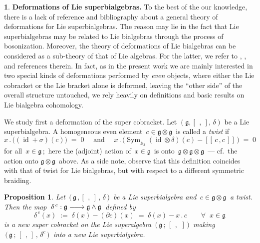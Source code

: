 \documentclass[12pt,reqno,twoside,a4paper]{amsart}
\numberwithin{equation}{section}
\newtheorem{prop}[lema]{Proposition}
\theoremstyle{definition}
\newtheorem{free text}[lema]{}
\theoremstyle{remark}
\newcommand \id{\operatorname{id}}
\newcommand \Sym{\operatorname{Sym}}
\def \lieg{\mathfrak{g}}
\theoremstyle{plain}
\begin{document}
\vskip9pt

\begin{free text}  \label{deformations of LSbA's}
%
{\bf Deformations of Lie superbialgebras.}
 To the best of the our knowledge, there is a lack of reference and bibliography about
 a general theory of  deformations  for Lie superbialgebras. The reason may lie in the fact that
 Lie superbialgebras may be related to Lie bialgebras through the process of bosonization. Moreover,
 the theory of deformations of Lie bialgebras can be considered as a sub-theory of that of Lie algebras. For
 the latter, we refer to
 \cite{CG},  \cite{MW}, and references therein.
 In fact, as in the present work we are mainly interested in two special kinds of deformations performed by
 \emph{even} objects,
 where either the Lie cobracket or the Lie bracket alone is deformed, leaving the ``other side'' of the overall structure untouched,
 we rely heavily on definitions and basic results on Lie bialgebra cohomology.

%
 \vskip3pt
%
  We study first a deformation of the super cobracket.  Let  $ (\lieg, [\,\ ,\ ],\, \delta)$
   be a Lie superbialgebra.  A homogeneous even element $ \, c \in \lieg \otimes \lieg \, $  is
   called a \emph{twist} if
%
\begin{equation}  \label{eq: twist-cond_Lie-superbialg}
   x\,.\,\big((\id +\sigma )(c)\big)  \; = \;  0
     \quad  \text{ and }  \quad
   x\,.\,\big( \Sym_{\mathbb{A}_{3}}(\id \otimes \delta)(c)  - [\![\, c \, , c \,]\!] \,\big)  \; = \;  0
%
\end{equation}
%
for all  $ \, x \in \lieg \, $;  \,here the (adjoint) action of  $ \, x \in \lieg \, $  is onto  $ \, \lieg \otimes \lieg \otimes \lieg \, $   --- cf.\ the action onto  $ \lieg \otimes \lieg \, $  above.  As a side note, observe that this definition coincides with that of twist for Lie bialgebras, but with respect to a different symmetric braiding.

\vskip11pt

\begin{prop}  \label{prop:twist-superliebial}
%
 Let  $ \, \big(\, \lieg \, , [\,\ ,\ ] \, , \, \delta \,\big) \, $  be a Lie superbialgebra and  $ \, c \in \lieg \otimes \lieg \, $   a twist. Then the map
$ \, \delta^{\,c} : \lieg \relbar\joinrel\longrightarrow \lieg \wedge \lieg \, $  defined by
%
\begin{equation}  \label{eq: def_twist-delta}
%
  \delta^{\,c}(x)  \; := \;  \delta(x) - (\partial c)(x)  \; = \;  \delta(x) - x\,.\,c   \qquad  \forall \;\; x \in \lieg
%
\end{equation}
%
 is a new super cobracket on the Lie superalgebra  $ \, \big(\, \lieg \, ; \, [\,\ ,\,\ ] \,\big) \, $  making  $ \, \big(\, \lieg \, ; \, [\,\ ,\ ] \, , \, \delta^{c} \,\big) \, $  into a new Lie superbialgebra.
%
\end{prop}


\end{free text}
\end{document}

